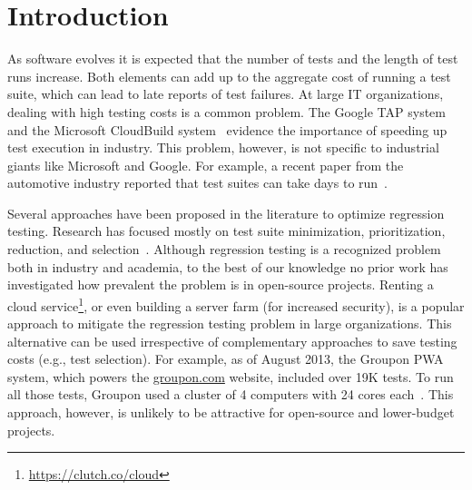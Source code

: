 \section{Introduction}


As software evolves it is expected that the number of tests and the
length of test runs increase.  Both elements can add up to the
aggregate cost of running a test suite, which can lead to late reports
of test failures.  At large IT organizations, dealing with high
testing costs is a common problem.  The Google TAP
system~\cite{google-tap,google-ci} and the Microsoft CloudBuild
system~\cite{prasad-shulte-ieee-microsoft-ci} evidence the importance
of speeding up test execution in industry.  This problem, however, is
not specific to industrial giants like Microsoft and Google.  For
example, a recent paper from the automotive industry reported that
test suites can take days to run~\cite{artl-etal-icst2015}.


Several approaches have been proposed in the literature to optimize
regression testing.  Research has focused mostly on test suite
minimization, prioritization, reduction, and
selection~\cite{yoo-harman-stvr2012}.  Although regression testing is
a recognized problem both in industry and academia, to the best of our
knowledge no prior work has investigated how prevalent the problem is
in open-source projects.  Renting a cloud
service\footnote{\url{https://clutch.co/cloud}}, or even building a
server farm (for increased security), is a popular approach to
mitigate the regression testing problem in large organizations.  This
alternative can be used irrespective of complementary approaches to
save testing costs (e.g., test selection).  For example, as of August
2013, the Groupon PWA system, which powers the \url{groupon.com}
website, included over 19K tests.  To run all those tests, Groupon
used a cluster of 4 computers with 24 cores
each~\cite{kim-etal-fse2013}.  This approach, however, is unlikely to
be attractive for open-source and lower-budget projects.  

